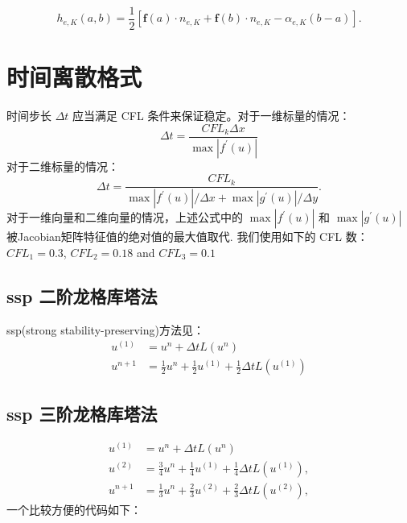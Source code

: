 \documentclass{book}
\begin{document}
\begin{equation}
    h_{e, K}(a, b)=\frac{1}{2}\left[\mathbf{f}(a) \cdot n_{e, K}+\mathbf{f}(b) \cdot n_{e, K}-\alpha_{e, K}(b-a)\right] .
\end{equation}



\section{时间离散格式}
时间步长 $\Delta t$  应当满足 CFL 条件来保证稳定。对于一维标量的情况：
\begin{equation}
    \Delta t=\frac{C F L_{k} \Delta x}{\max \left|f^{\prime}(u)\right|}
\end{equation}
对于二维标量的情况：
\begin{equation}
    \Delta t=\frac{C F L_{k}}{\max \left|f^{\prime}(u)\right| / \Delta x+\max \left|g^{\prime}(u)\right| / \Delta y} .
\end{equation}
对于一维向量和二维向量的情况，上述公式中的 $\max \left|f^{\prime}(u)\right|$ 和 $\max \left|g^{\prime}(u)\right|$  被Jacobian矩阵特征值的绝对值的最大值取代. 我们使用如下的 CFL 数\cite{RN109}\cite{RN133}\cite{RN148}：  $CFL_1=0.3$, $C F L_{2}=0.18$  and  $C F L_{3}=0.1$

\subsection{ssp 二阶龙格库塔法}
ssp(strong stability-preserving)方法见：\cite{RN96}
\begin{equation}
    \begin{aligned}
        u^{(1)} & =u^{n}+\Delta t L\left(u^{n}\right)                                               \\
        u^{n+1} & =\frac{1}{2} u^{n}+\frac{1}{2} u^{(1)}+\frac{1}{2} \Delta t L\left(u^{(1)}\right)
    \end{aligned}
\end{equation}
\subsection{ssp 三阶龙格库塔法}
\begin{equation}
    \begin{aligned}
        u^{(1)} & =u^{n}+\Delta t L\left(u^{n}\right)                                                \\
        u^{(2)} & =\frac{3}{4} u^{n}+\frac{1}{4} u^{(1)}+\frac{1}{4} \Delta t L\left(u^{(1)}\right), \\
        u^{n+1} & =\frac{1}{3} u^{n}+\frac{2}{3} u^{(2)}+\frac{2}{3} \Delta t L\left(u^{(2)}\right),
    \end{aligned}
\end{equation}
一个比较方便的代码如下：
\end{document}
